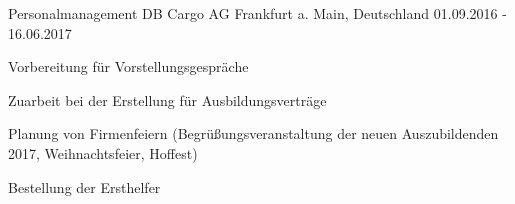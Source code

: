 \begin{cventries}
  \cventry
    {Personalmanagement} %
    {DB Cargo AG} %
    {Frankfurt a. Main, Deutschland} %
    {01.09.2016 - 16.06.2017} %
    {
      \begin{cvitems} %
        \item {Vorbereitung für Vorstellungsgespräche}
        \item {Zuarbeit bei der Erstellung für Ausbildungsverträge}
        \item {Planung von Firmenfeiern (Begrüßungsveranstaltung der neuen Auszubildenden 2017, Weihnachtsfeier, Hoffest)}
        \item{Bestellung der Ersthelfer}
      \end{cvitems}
    }

\end{cventries}
